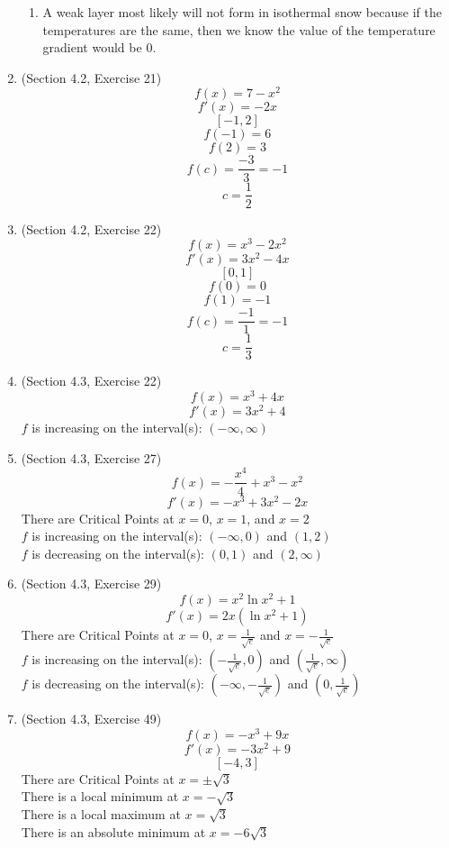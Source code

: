 \documentclass{article}
\begin{document}
\begin{enumerate}
\begin{enumerate}
            \item A weak layer most likely will not form in isothermal snow because if the temperatures are the same, then we know the value of the temperature gradient would be $0$.
        \end{enumerate}
    \item (Section 4.2, Exercise 21)
        $$f(x) = 7 - x^2$$
        $$f'(x) = -2x$$
        $$[-1, 2]$$
        $$f(-1) = 6$$
        $$f(2) = 3$$
        $$f(c) = \frac{-3}{3} = -1$$
        $$c = \frac{1}{2}$$
    \item (Section 4.2, Exercise 22)
        $$f(x) = x^3 - 2x^2$$
        $$f'(x) = 3x^2 - 4x$$
        $$[0, 1]$$
        $$f(0) = 0$$
        $$f(1) = -1$$
        $$f(c) = \frac{-1}{1} = -1$$
        $$c = \frac{1}{3}$$
    \item (Section 4.3, Exercise 22)
        $$f(x) = x^3 + 4x$$
        $$f'(x) = 3x^2 + 4$$
        $f$ is increasing on the interval(s): $(-\infty, \infty)$
    \item (Section 4.3, Exercise 27)
        $$f(x) = -\frac{x^4}{4} + x^3 - x^2$$
        $$f'(x) = -x^3 + 3x^2 - 2x$$
        There are Critical Points at $x = 0$, $x = 1$, and $x = 2$ \\
        $f$ is increasing on the interval(s): $\left(-\infty, 0\right)$ and $\left(1, 2\right)$ \\
        $f$ is decreasing on the interval(s): $\left(0, 1\right)$ and $\left(2, \infty\right)$
    \item (Section 4.3, Exercise 29)
        $$f(x) = x^2\ln{x^2} + 1$$
        $$f'(x) = 2x\left(\ln{x^2} + 1\right)$$
        There are Critical Points at $x = 0$, $x = \frac{1}{\sqrt{e}}$ and $x = -\frac{1}{\sqrt{e}}$ \\
        $f$ is increasing on the interval(s): $\left(-\frac{1}{\sqrt{e}}, 0\right)$ and $\left(\frac{1}{\sqrt{e}}, \infty\right)$ \\
        $f$ is decreasing on the interval(s): $\left(-\infty, -\frac{1}{\sqrt{e}}\right)$ and $\left(0, \frac{1}{\sqrt{e}}\right)$
    \item (Section 4.3, Exercise 49)
        $$f(x) = -x^3 + 9x$$
        $$f'(x) = -3x^2 + 9$$
        $$[-4, 3]$$
        There are Critical Points at $x = \pm \sqrt{3}$ \\
        There is a local minimum at $x = -\sqrt{3}$ \\
        There is a local maximum at $x = \sqrt{3}$ \\
        There is an absolute minimum at $x = -6\sqrt{3}$ \\

\end{enumerate}
\end{document}
